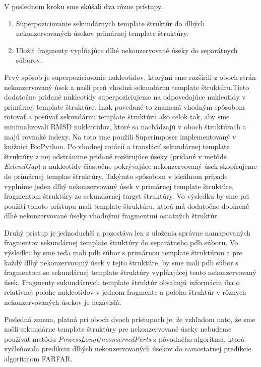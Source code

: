 \indent V poslednom kroku sme skúšali dva rôzne prístupy. 
\begin{enumerate}
\item Superpoziciovanie sekundárnych template štruktúr do dlhých nekonzervovaných úsekov primárnej template štruktúry.
\item Uložiť fragmenty vypĺňajúce dlhé nekonzervované úseky do separátnych súborov.
\end{enumerate}

\indent Prvý spôsob je superpoziciovanie nukleotidov, ktorými sme rozšírili z oboch strán nekonzervovaný úsek a našli preň vhodnú sekundárnu template štruktúru.Tieto dodatočne pridané nukleotidy superpoziciujeme na odpovedajúce nukleotidy v primárnej template štruktúre. Inak povedané to znamená vhodným spôsobom rotovať a posúvať sekundárnu template štruktúru ako celok tak, aby sme minimalizovali RMSD nukleotidov, ktoré sa nachádzajú v oboch štruktúrach a majú rovnaké indexy. Na toto sme použili Superimposer implementovaný v knižnici BioPython. Po vhodnej rotácií a translácií sekundárnej template štruktúry z nej odstránime pridané rozširujúce úseky (pridané v metóde \textit{ExtendGap}) a nukleotidy čiastočne pokrývajúce nekonzervovaný úsek skopírujeme do primárnej templae štruktúry. Takýmto spôsobom v ideálnom prípade vyplníme jeden dlhý nekonzervovaný úsek v primárnej template štruktúre, fragmentom štruktúry zo sekundárnej target štruktúry. Vo výsledku by sme pri použití tohoto prístupu mali template štruktúru, ktorá má dodatočne doplnené dlhé nekonzervované úseky vhodnými fragmentmi ostatných štruktúr. 


\indent Druhý prístup je jednoduchší a pozostáva len z uloženia správne namapovaných fragmentov sekundárnej template štruktúry do separátneho pdb súboru. Vo výsledku by sme teda mali pdb súbor s primárnou template štruktúrou a pre každý dlhý nekonzervovaný úsek v tejto štruktúre, by sme mali pdb súbor s fragmentom so sekundárnej template štruktúry vypĺňajúcej tento nekonzervovaný úsek. Fragmenty sukundárnych template štruktúr obsahujú informáciu iba o  relatívnej polohe nukleotidov v jednom fragmente a poloha štruktúr v rôznych nekonzervovaných úsekov je nezávislá.


\indent Posledná zmena, platná pri oboch dvoch prístupoch je, že vzhľadom nato, že sme našli sekundárne template štruktúry pre nekonzervované úseky nebudeme používať metódu \textit{ProcessLongUnconservedParts} z pôvodného algoritmu, ktorá vyčleňovala predikciu dlhých nekonzervovaných úsekov do samostatnej predikcie algoritmom FARFAR.

